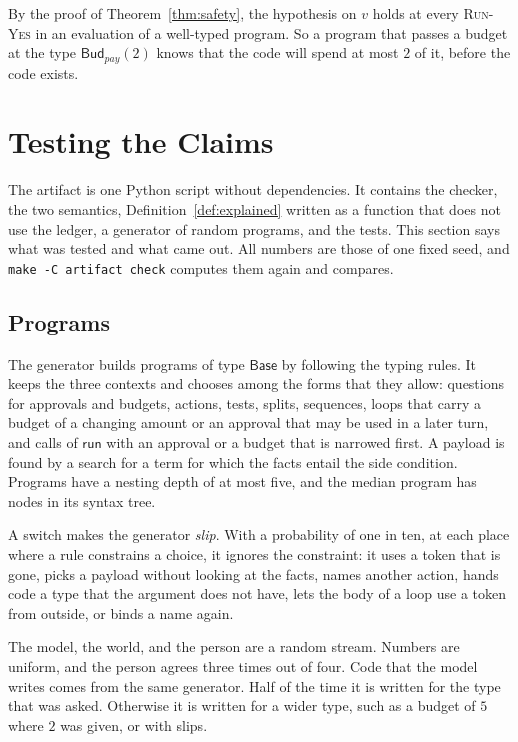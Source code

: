 \documentclass[acmsmall,nonacm,screen]{acmart}
\newcommand{\kw}[1]{\mathsf{#1}}
\newcommand{\nm}[1]{\mathit{#1}}
\newcommand{\Base}{\kw{Base}}
\newcommand{\Bud}[2]{\kw{Bud}_{#1}(#2)}
\newcommand{\pay}{\nm{pay}}
\begin{document}
By the proof of Theorem~\ref{thm:safety}, the hypothesis on $v$ holds at every \textsc{Run-Yes}
in an evaluation of a well-typed program. So a program that passes a budget at the type
$\Bud{\pay}{2}$ knows that the code will spend at most $2$ of it, before the code exists.

\section{Testing the Claims}
\label{sec:tests}

The artifact is one Python script without dependencies. It contains the checker, the two
semantics, Definition~\ref{def:explained} written as a function that does not use the ledger,
a generator of random programs, and the tests. This section says what was tested and what came
out. All numbers are those of one fixed seed, and \texttt{make -C artifact check} computes them
again and compares.

\subsection{Programs}

The generator builds programs of type $\Base$ by following the typing rules. It keeps the
three contexts and chooses among the forms that they allow: questions for approvals and
budgets, actions, tests, splits, sequences, loops that carry a budget of a changing amount or
an approval that may be used in a later turn, and calls of $\kw{run}$ with an approval or a
budget that is narrowed first. A payload is found by a search for a term for which the facts
entail the side condition. Programs have a nesting depth of at most five, and the median
program has \exMedianNodes{} nodes in its syntax tree.

A switch makes the generator \emph{slip}. With a probability of one in ten, at each place where
a rule constrains a choice, it ignores the constraint: it uses a token that is gone, picks a
payload without looking at the facts, names another action, hands code a type that the
argument does not have, lets the body of a loop use a token from outside, or binds a name
again.

The model, the world, and the person are a random stream. Numbers are uniform, and the person
agrees three times out of four. Code that the model writes comes from the same generator. Half
of the time it is written for the type that was asked. Otherwise it is written for a wider
type, such as a budget of $5$ where $2$ was given, or with slips.
\end{document}
